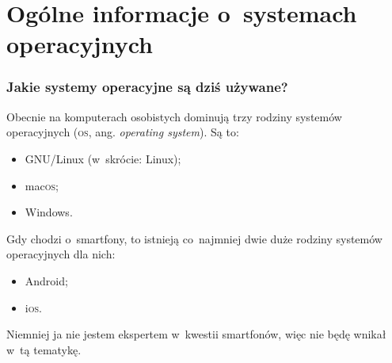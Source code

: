 \documentclass[10pt,t]{beamer}
\begin{document}
\section{Ogólne informacje o~systemach operacyjnych}


\begin{frame}
  \frametitle{Jakie systemy operacyjne są dziś używane?}


  Obecnie na komputerach osobistych dominują trzy rodziny systemów
  operacyjnych (\textsc{os}, ang. \textit{operating system}). Są to:
  \begin{itemize}

  \item GNU/Linux (w~skrócie: Linux);

  \item mac\textsc{os};

  \item Windows.

  \end{itemize}

  Gdy chodzi o~smartfony, to istnieją co~najmniej dwie duże rodziny systemów
  operacyjnych dla nich:
  \begin{itemize}

  \item Android;

  \item i\textsc{os}.

  \end{itemize}
  Niemniej ja nie jestem ekspertem w~kwestii smartfonów, więc nie będę
  wnikał w~tą tematykę.


\end{frame}
\end{document}
